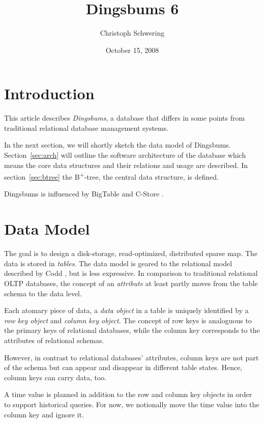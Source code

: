 \documentclass[a4paper, 9pt]{scrartcl}
\title{Dingsbums 6}
\date{October 15, 2008}
\author{Christoph Schwering}
\theoremstyle{plain}
\theoremstyle{definition}
\theoremstyle{remark}
\begin{document}



\maketitle


\begin{multicols}{2}

\section{Introduction}
This article describes {\em Dingsbums}, a database that differs in some points
from traditional relational database management systems.

In the next section, we will shortly sketch the data model of Dingsbums.
Section~\ref{sec:arch} will outline the software architecture of the
database which means the core data structures and their relations and usage
are described.
In section~\ref{sec:btree} the B\textsuperscript{+}-tree, the central
data structure, is defined.

Dingsbums is influenced by BigTable \cite{BigTable} and C-Store \cite{CStore}.



\section{Data Model} \label{sec:dm}
The goal is to design a disk-storage, read-optimized, distributed sparse map.
The data is stored in {\em tables}.
The data model is geared to the relational model described by Codd \cite{Codd},
but is less expressive.
In comparison to traditional relational OLTP databases, the concept of an
{\em attribute} at least partly moves from the table schema to the data level.

Each atomary piece of data, a {\em data object} in a table is uniquely
identified by a {\em row key object} and {\em column key object}.
The concept of row keys is analoguous to the primary keys of relational
databases, while the column key corresponds to the attributes of relational
schemas.

However, in contrast to relational databases' attributes, column keys  are not
part of the schema but can appear and disappear in different table states.
Hence, column keys can carry data, too.

A time value is planned in addition to the row and column key objects
in order to support historical queries. For now, we notionally move the
time value into the column key and ignore it.


\end{multicols}
\end{document}
